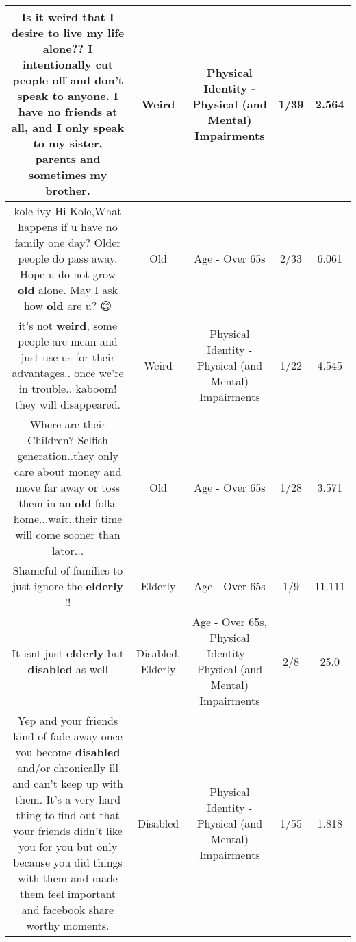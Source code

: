 \documentclass[11pt]{article}
\newlength\mylength
\begin{document}
\begin{center}
\begin{longtable}{|C{.65\mylength}|C{.30\mylength}|C{.12\mylength}|C{.12\mylength}|C{.12\mylength}|}
  \small Is it \textbf{weird} that I desire to live my life alone?? I intentionally cut people off and don't speak to anyone. I have no friends at all, and I only speak to my sister, parents and sometimes my brother.\normalsize   & Weird & Physical Identity - Physical (and Mental) Impairments & 1/39 & 2.564 \\  \hline
  \small kole ivy Hi Kole,What happens if u have no family one day? Older people do pass away. Hope u do not grow \textbf{old} alone. May I ask how \textbf{old} are u? 😊\normalsize   & Old & Age - Over 65s & 2/33 & 6.061 \\  \hline
  \small it's not \textbf{weird}, some people are mean and just use us for their advantages.. once we're in trouble.. kaboom! they will disappeared.\normalsize   & Weird & Physical Identity - Physical (and Mental) Impairments & 1/22 & 4.545 \\  \hline
  \small Where are their Children? Selfish generation..they only care about money and move far away or toss them in an \textbf{old} folks home...wait..their time will come sooner than lator...\normalsize   & Old & Age - Over 65s & 1/28 & 3.571 \\  \hline
  \small Shameful of families to just ignore the \textbf{elderly} !!\normalsize   & Elderly & Age - Over 65s & 1/9 & 11.111 \\  \hline
  \small It isnt just \textbf{elderly} but \textbf{disabled} as well\normalsize   & Disabled, Elderly & Age - Over 65s, Physical Identity - Physical (and Mental) Impairments & 2/8 & 25.0 \\  \hline
  \small Yep and your friends kind of fade away once you become \textbf{disabled} and/or chronically ill and can't keep up with them. It's a very hard thing to find out that your friends didn't like you for you but only because you did things with them and made them feel important and facebook share worthy moments.\normalsize   & Disabled & Physical Identity - Physical (and Mental) Impairments & 1/55 & 1.818 \\  \hline

\end{longtable}
\end{center}
\end{document}
